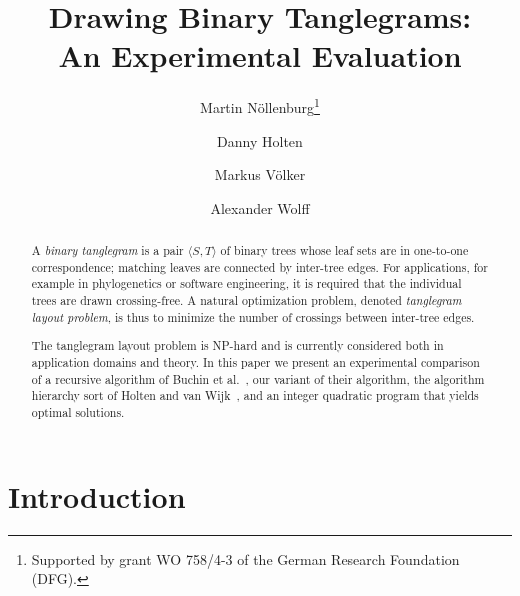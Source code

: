 \documentclass[runningheads,a4paper]{llncs}
\newcommand{\ttree}[1]{\ensuremath{\langle #1 \rangle}}
\begin{document}
\title{Drawing Binary Tanglegrams: \\[.5ex] \large An Experimental Evaluation}


\author{
Martin N\"ollenburg\thanks{Supported by grant WO 758/4-3 of
  the German Research Foundation (DFG).} \and Danny Holten \and Markus V\"olker \and Alexander Wolff
}


\maketitle

\begin{abstract}
  A \emph{binary tanglegram} is a pair \ttree{S,T} of binary trees
  whose leaf sets are in one-to-one correspondence; matching leaves
  are connected by inter-tree edges.  For applications, for example in
  phylogenetics or software engineering, it is required that the
  individual trees are drawn crossing-free. A natural optimization
  problem, denoted \emph{tanglegram layout problem}, is thus to
  minimize the number of crossings between inter-tree edges.

  The tanglegram layout problem is NP-hard and is currently considered
  both in application domains and theory.  In this paper we present an
  experimental comparison of a recursive algorithm of Buchin et
  al.~\cite{bbbnow-dbtha-08}, our variant of their algorithm, the
  algorithm hierarchy sort of Holten and van Wijk~\cite{hw-vchod-08},
  and an integer quadratic program that yields optimal solutions.
\end{abstract}

\section{Introduction}
\end{document}
